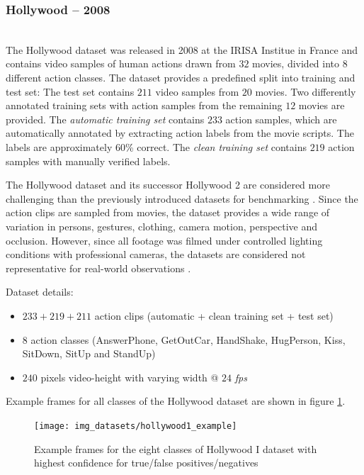 \subsubsection{Hollywood -- 2008}
\cite{laptev_learning_2008} \\
The Hollywood dataset was released in 2008 at the IRISA Institue in France and contains video samples of human actions drawn from $32$ movies, divided into $8$ different action classes.
The dataset provides a predefined split into training and test set:
The test set contains $211$ video samples from $20$ movies.
Two differently annotated training sets with action samples from the remaining $12$ movies are provided.
The \textit{automatic training set} contains $233$ action samples, which are automatically annotated by extracting action labels from the movie scripts.
The labels are approximately 60\% correct.
The \textit{clean training set} contains $219$ action samples with manually verified labels.

The Hollywood dataset and its successor Hollywood 2 are considered more challenging than the previously introduced datasets for benchmarking \cite{chaquet_survey_2013}.
Since the action clips are sampled from movies, the dataset provides a wide range of variation in persons, gestures, clothing, camera motion, perspective and occlusion.
However, since all footage was filmed under controlled lighting conditions with professional cameras, the datasets are considered not representative for real-world observations \cite{kang_review_2016}.

Dataset details: \cite{_ivan_????}
\begin{itemize}
    \item $233 + 219 + 211$ action clips (automatic + clean training set + test set)
    \item $8$ action classes (AnswerPhone, GetOutCar, HandShake, HugPerson, Kiss, SitDown, SitUp and StandUp)
    \item $240$ pixels video-height with varying width @ $24$ \textit{fps} 
\end{itemize}

Example frames for all classes of the Hollywood dataset are shown in figure \ref{fig:hollywood1_example}.

\begin{figure}[H]
    \centering
    \texttt{[image: img\_datasets/hollywood1\_example]}
    \caption{Example frames for the eight classes of Hollywood I dataset with highest confidence for true/false positives/negatives \cite{laptev_learning_2008}}
    \label{fig:hollywood1_example}
\end{figure}


